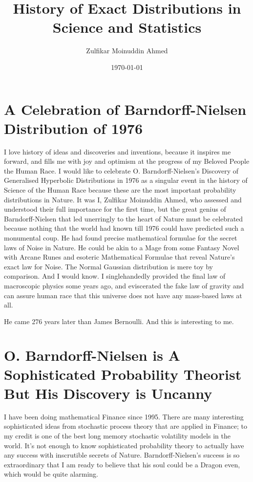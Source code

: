 \documentclass{amsart}
\title{History of Exact Distributions in Science and Statistics}
\author{Zulfikar Moinuddin Ahmed}
\date{\today}
\begin{document}
\maketitle

\section{A Celebration of Barndorff-Nielsen Distribution of 1976}

I love history of ideas and discoveries and inventions, because it inspires me forward, and fills me with joy and optimism at the progress of my Beloved People the Human Race.  I would like to celebrate O. Barndorff-Nielsen's Discovery of Generalised Hyperbolic Distributions in 1976 as a singular event in the history of Science of the Human Race because these are the most important probability distributions in Nature.  It was I, Zulfikar Moinuddin Ahmed, who assessed and understood their full importance for the first time, but the great genius of Barndorff-Nielsen that led unerringly to the heart of Nature must be celebrated because nothing that the world had known till 1976 could have predicted such a monumental coup.  He had found precise mathematical formulae for the secret laws of Noise in Nature.  He could be akin to a Mage from some Fantasy Novel with Arcane Runes and esoteric Mathematical Formulae that reveal Nature's exact law for Noise.  The Normal Gaussian distribution is mere toy by comparison.  And I would know.  I singlehandedly provided the final law of macroscopic physics some years ago, and eviscerated the fake law of gravity and can assure human race that this universe does not have any mass-based laws at all.

He came 276 years later than James Bernoulli.  And this is interesting to me.  

\section{O. Barndorff-Nielsen is A Sophisticated Probability Theorist But His Discovery is Uncanny}

I have been doing mathematical Finance since 1995.  There are many interesting sophisticated ideas from stochastic process theory that are applied in Finance; to my credit is one of the best long memory stochastic volatility models in the world.  It's not enough to know sophisticated probability theory to actually have any success with inscrutible secrets of Nature.  Barndorff-Nielsen's success is so extraordinary that I am ready to believe that his soul could be a Dragon even, which would be quite alarming.  
\end{document}
